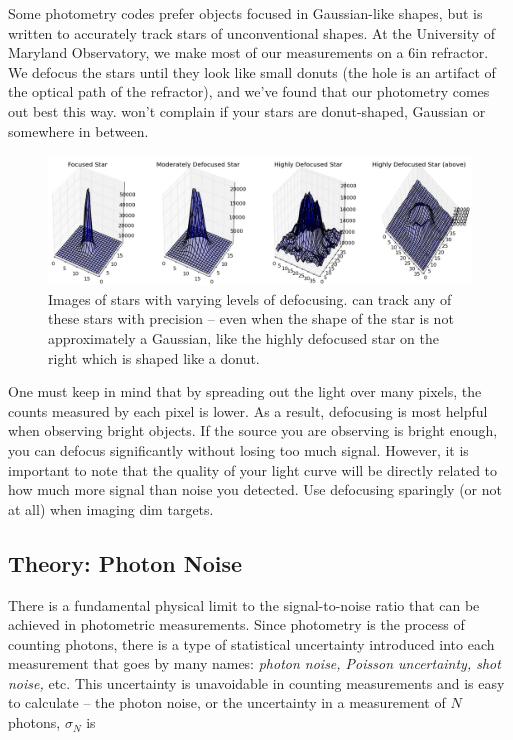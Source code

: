 \documentclass{article}
\begin{document}
Some photometry codes prefer objects focused in Gaussian-like shapes, but \oscaar is written to accurately track stars of unconventional shapes. At the University of Maryland Observatory, we make most of our measurements on a 6in refractor. We defocus the stars until they look like small donuts (the hole is an artifact of the optical path of the refractor), and we've found that our photometry comes out best this way. \oscaar won't complain if your stars are donut-shaped, Gaussian or somewhere in between. 

\begin{figure}
\includegraphics[scale=0.34]{imgs/focusing.png}
\caption{Images of stars with varying levels of defocusing. \oscaar can track any of these stars with precision -- even when the shape of the star is not approximately a Gaussian, like the highly defocused star on the right which is shaped like a donut.}
\label{fig:defocus}
\end{figure}

One must keep in mind that by spreading out the light over many pixels, the counts measured by each pixel is lower. As a result, defocusing is most helpful when observing bright objects. If the source you are observing is bright enough, you can defocus significantly without losing too much signal. However, it is important to note that the quality of your light curve will be directly related to how much more signal than noise you detected. Use defocusing sparingly (or not at all) when imaging dim targets.

\subsection{Theory: Photon Noise}

There is a fundamental physical limit to the signal-to-noise ratio that can be achieved in photometric measurements. Since photometry is the process of counting photons, there is a type of statistical uncertainty introduced into each measurement that goes by many names: \textit{photon noise, Poisson uncertainty, shot noise,} etc. This uncertainty is unavoidable in counting measurements and is easy to calculate -- the photon noise, or the uncertainty in a measurement of $N$ photons, $\sigma_N$ is
\end{document}
